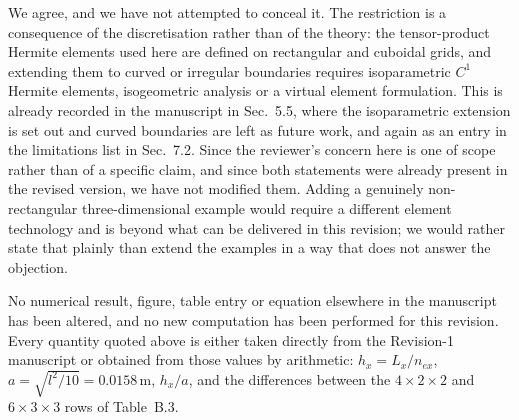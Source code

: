 \documentclass[12pt,a4paper]{article}
\begin{document}
We agree, and we have not attempted to conceal it. The restriction is a consequence of the discretisation rather than of the theory: the tensor-product Hermite elements used here are defined on rectangular and cuboidal grids, and extending them to curved or irregular boundaries requires isoparametric $C^1$ Hermite elements, isogeometric analysis or a virtual element formulation. This is already recorded in the manuscript in Sec.~5.5, where the isoparametric extension is set out and curved boundaries are left as future work, and again as an entry in the limitations list in Sec.~7.2. Since the reviewer's concern here is one of scope rather than of a specific claim, and since both statements were already present in the revised version, we have not modified them. Adding a genuinely non-rectangular three-dimensional example would require a different element technology and is beyond what can be delivered in this revision; we would rather state that plainly than extend the examples in a way that does not answer the objection.


\vspace{0.4cm}

No numerical result, figure, table entry or equation elsewhere in the manuscript has been altered, and no new computation has been performed for this revision. Every quantity quoted above is either taken directly from the Revision-1 manuscript or obtained from those values by arithmetic: $h_x=L_x/n_{ex}$, $a=\sqrt{l^2/10}=0.0158$\,m, $h_x/a$, and the differences between the $4\times2\times2$ and $6\times3\times3$ rows of Table~B.3.


\end{document}
